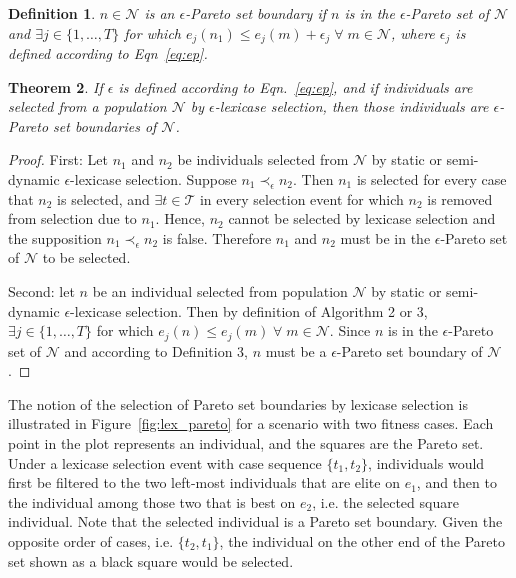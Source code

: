 \documentclass[twoside]{article}
\newtheorem{lex}{Theorem}[section]
\newtheorem{defn}[lex]{Definition}
\begin{document}
\begin{defn}\label{def:eboundary}
$n \in \mathcal{N}$ is an {\it $\epsilon$-Pareto set boundary} if $n$ is in the $\epsilon$-Pareto set of $\mathcal{N}$ and $\exists j \in \{1,\dots,T\}$ for which $e_j(n_1) \leq e_j(m)+ \epsilon_j \; \forall \; m \in \mathcal{N}$, where $\epsilon_j$ is defined according to Eqn~\ref{eq:ep}. \bigskip
\end{defn}

\begin{lex}\label{thm:eplex}
If $\epsilon$ is defined according to Eqn.~\ref{eq:ep}, and if individuals are selected from a population $\mathcal{N}$ by $\epsilon$-lexicase selection, then those individuals are $\epsilon$-Pareto set boundaries of $\mathcal{N}$.  
\end{lex}


\begin{proof}
First: Let $n_1$ and $n_2$ be individuals selected from $\mathcal{N}$ by static or semi-dynamic $\epsilon$-lexicase selection. Suppose $n_1 \prec_{\epsilon} n_2$. Then $n_1$ is selected for every case that $n_2$ is selected, and $\exists t \in \mathcal{T}$ in every selection event for which $n_2$ is removed from selection due to $n_1$. Hence, $n_2$ cannot be selected by lexicase selection and the supposition $n_1 \prec_{\epsilon} n_2$ is false.  Therefore $n_1$ and $n_2$ must be in the $\epsilon$-Pareto set of $\mathcal{N}$ to be selected. 

Second: let $n$ be an individual selected from population $\mathcal{N}$ by static or semi-dynamic $\epsilon$-lexicase selection. Then by definition of Algorithm 2 or 3, $\exists j \in \{1,\dots,T\}$ for which $e_j(n) \leq e_j(m) \; \forall \; m \in \mathcal{N}$. Since $n$ is in the $\epsilon$-Pareto set of $\mathcal{N}$ and according to Definition 3, $n$ must be a $\epsilon$-Pareto set boundary of $\mathcal{N}$.  
\end{proof}
\bigskip

The notion of the selection of Pareto set boundaries by lexicase selection is illustrated in Figure~\ref{fig:lex_pareto} for a scenario with two fitness cases. Each point in the plot represents an individual, and the squares are the Pareto set. Under a lexicase selection event with case sequence $\{t_1, t_2\}$, individuals would first be filtered to the two left-most individuals that are elite on $e_1$, and then to the individual among those two that is best on $e_2$, i.e. the selected square individual. Note that the selected individual is a Pareto set boundary. Given the opposite order of cases, i.e. $\{t_2, t_1\}$, the individual on the other end of the Pareto set shown as a black square would be selected.   
\end{document}
